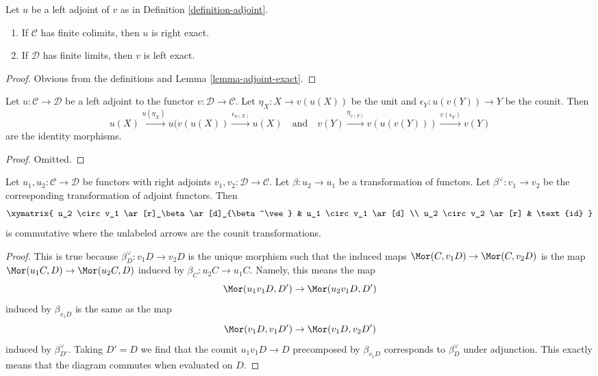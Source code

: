 \begin{lemma}
\label{lemma-exact-adjoint}
Let $u$ be a left adjoint of $v$ as in Definition \ref{definition-adjoint}.
\begin{enumerate}
\item If $\mathcal{C}$ has finite colimits, then $u$ is right exact.
\item If $\mathcal{D}$ has finite limits, then $v$ is left exact.
\end{enumerate}
\end{lemma}

\begin{proof}
Obvious from the definitions and Lemma \ref{lemma-adjoint-exact}.
\end{proof}

\begin{lemma}
\label{lemma-unit-counit-relations}
Let $u : \mathcal{C} \to \mathcal{D}$ be a left adjoint to the functor
$v : \mathcal{D} \to \mathcal{C}$. Let $\eta_X : X \to v(u(X))$ be the unit
and $\epsilon_Y : u(v(Y)) \to Y$ be the counit. Then
$$
u(X) \xrightarrow{u(\eta_X)} u(v(u(X))
\xrightarrow{\epsilon_{u(X)}} u(X)
\quad\text{and}\quad
v(Y) \xrightarrow{\eta_{v(Y)}} v(u(v(Y))) \xrightarrow{v(\epsilon_Y)}
v(Y)
$$
are the identity morphisms.
\end{lemma}

\begin{proof}
Omitted.
\end{proof}

\begin{lemma}
\label{lemma-transformation-between-functors-and-adjoints}
Let $u_1, u_2 : \mathcal{C} \to \mathcal{D}$ be functors with right
adjoints $v_1, v_2 : \mathcal{D} \to \mathcal{C}$. Let $\beta : u_2 \to u_1$
be a transformation of functors. Let $\beta^\vee : v_1 \to v_2$ be
the corresponding transformation of adjoint functors. Then
$$
\xymatrix{
u_2 \circ v_1 \ar[r]_\beta \ar[d]_{\beta^\vee} &
u_1 \circ v_1 \ar[d] \\
u_2 \circ v_2 \ar[r] & \text{id}
}
$$
is commutative where the unlabeled arrows are the counit transformations.
\end{lemma}

\begin{proof}
This is true because $\beta^\vee_D : v_1D \to v_2D$ is the unique
morphism such that the induced maps $\Mor(C, v_1D) \to \Mor(C, v_2D)$
is the map $\Mor(u_1C, D) \to \Mor(u_2C, D)$ induced by
$\beta_C : u_2C \to u_1C$. Namely, this means the map
$$
\Mor(u_1 v_1 D, D') \to \Mor(u_2 v_1 D, D')
$$
induced by $\beta_{v_1 D}$ is the same as the map
$$
\Mor(v_1 D, v_1 D') \to \Mor(v_1 D, v_2 D')
$$
induced by $\beta^\vee_{D'}$. Taking $D' = D$ we find that the counit
$u_1 v_1 D \to D$ precomposed by $\beta_{v_1D}$ corresponds to $\beta^\vee_D$
under adjunction. This exactly means that the diagram commutes when
evaluated on $D$.
\end{proof}

